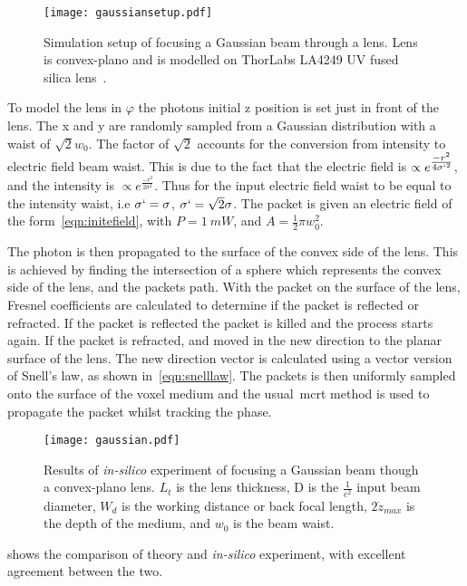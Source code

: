 \begin{figure}[!ht]
    \centering
    \texttt{[image: gaussiansetup.pdf]}
    \caption{Simulation setup of focusing a Gaussian beam through a lens. Lens is convex-plano and is modelled on ThorLabs LA4249 UV fused silica lens~\cite{thorlens}.}
    \label{fig:gausssetup}
\end{figure}

To model the lens in $\varphi$ the photons initial z position is set just in front of the lens.
The x and y are randomly sampled from a Gaussian distribution with a waist of $\sqrt{2}w_0$.
The factor of $\sqrt{2}$ accounts for the conversion from intensity to electric field beam waist.
This is due to the fact that the electric field is $\propto e^{\tfrac{-r^2}{4\sigma`^2}}$, and the intensity is $\propto e^{\tfrac{-r^2}{2\sigma^2}}$.
Thus for the input electric field waist to be equal to the intensity waist, i.e $\sigma`=\sigma$, $\sigma`=\sqrt{2}\sigma$.
The packet is given an electric field of the form~\cref{eqn:initefield}, with $P=1~mW$, and $A=\tfrac{1}{2}\pi w_0^2$.

The photon is then propagated to the surface of the convex side of the lens.
This is achieved by finding the intersection of a sphere which represents the convex side of the lens, and the packets path.
With the packet on the surface of the lens, Fresnel coefficients are calculated to determine if the packet is reflected or refracted.
If the packet is reflected the packet is killed and the process starts again.
If the packet is refracted, and moved in the new direction to the planar surface of the lens.
The new direction vector is calculated using a vector version of Snell's law, as shown in~\cref{eqn:snelllaw}.
The packets is then uniformly sampled onto the surface of the voxel medium and the usual~\gls*{mcrt} method is used to propagate the packet whilst tracking the phase.

\begin{figure}[!ht]
    \centering
    \texttt{[image: gaussian.pdf]}
    \caption{Results of \textit{in-silico} experiment of focusing a Gaussian beam though a convex-plano lens. $L_t$ is the lens thickness, D is the $\tfrac{1}{e^2}$ input beam diameter, $W_d$ is the working distance or back focal length, $2\dot z_{max}$ is the depth of the medium, and $w_0$ is the beam waist.}
    \label{fig:simgaussexp}
\end{figure}


 shows the comparison of theory and \textit{in-silico} experiment, with excellent agreement between the two.

